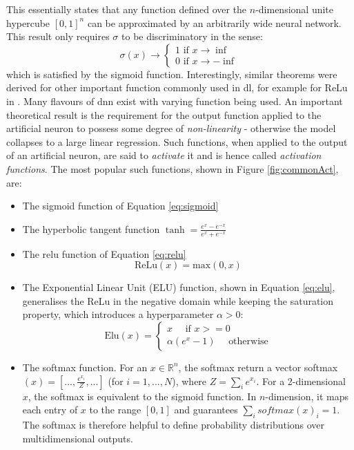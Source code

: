 This essentially states that any function defined over the $n$-dimensional unite hypercube $[0, 1]^n$ can be approximated by an arbitrarily wide neural network. This result only requires $\sigma$ to be discriminatory in the sense:
\begin{equation}
    \sigma(x) \rightarrow
    \begin{cases}
        1 \text{ if } x \rightarrow \inf  \\
        0 \text{ if } x \rightarrow -\inf
    \end{cases}
\end{equation}
which is satisfied by the sigmoid function. Interestingly, similar theorems were derived for other important function commonly used in \gls{dl}, for example for ReLu in \cite{universApproximator-Relu}. Many flavours of \gls{dnn} exist with varying function being used. An important theoretical result is the requirement for the output function applied to the artificial neuron to possess some degree of \textit{non-linearity} - otherwise the model collapses to a large linear regression. Such functions, when applied to the output of an artificial neuron, are said to \textit{activate} it and is hence called \textit{activation functions}. The most popular such functions, shown in Figure \ref{fig:commonAct}, are:
\begin{itemize}
    \item The sigmoid function of Equation \ref{eq:sigmoid}
    \item The hyperbolic tangent function $\tanh = \frac{e^x - e^{-x}}{e^x + e^{-x}}$
    \item The \gls{relu} function of Equation \ref{eq:relu}
    \begin{equation}\label{eq:relu}
        \text{ReLu}(x) = \text{max}(0, x)
    \end{equation}
    \item The Exponential Linear Unit (ELU) function, shown in Equation \ref{eq:elu}, generalises the ReLu in the negative domain while keeping the saturation property, which introduces a hyperparameter $\alpha > 0$:
    \begin{equation}\label{eq:elu}
        \text{Elu}(x) = 
        \begin{cases}
            x \quad \text{ if } x >= 0 \\
            \alpha (e^x - 1)  \quad  \text{ otherwise}
        \end{cases}
    \end{equation}
    \item The softmax function. For an $x \in \mathbb{R}^n$, the softmax return a vector softmax$(x) = [..., \frac{e^{x_i}}{Z}, ...]$ (for $i= 1, ..., N$), where $Z = \sum_i e^{x_i}$. For a 2-dimensional $x$, the softmax is equivalent to the sigmoid function. In $n$-dimension, it maps each entry of $x$ to the range $[0, 1]$ and guarantees $\sum_i softmax(x)_i = 1$. The softmax is therefore  helpful to define probability distributions over multidimensional outputs.
\end{itemize}


